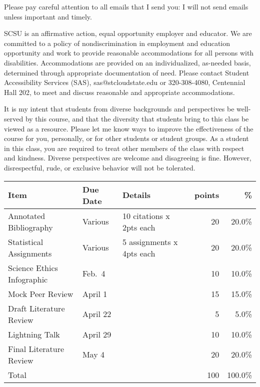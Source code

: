 \documentclass{tufte-handout}
\begin{document}
\begin{fullwidth}

\color{blue}
Please pay careful attention to all emails that I send you: I will not send emails unless important and timely. 
\color{black}


 SCSU is an affirmative action, equal opportunity employer and educator. We are committed to a policy of nondiscrimination in employment and education opportunity and work to provide reasonable accommodations for all persons with disabilities. Accommodations are provided on an individualized, as-needed basis, determined through appropriate documentation of need. Please contact Student Accessibility Services (SAS), sas@stcloudstate.edu or 320-308-4080, Centennial Hall 202, to meet and discuss reasonable and appropriate accommodations. 

 It is my intent that students from diverse backgrounds and perspectives be well-served by this course, and that the diversity that students bring to this class be viewed as a resource. Please let me know ways to improve the effectiveness of the course for you, personally, or for other students or student groups. As a student in this class, you are required to treat other members of the class with respect and kindness. Diverse perspectives are welcome and disagreeing is fine. However, disrespectful, rude, or exclusive behavior will not be tolerated.


\end{fullwidth}


\begin{fullwidth}



\begin{table}
\begin{tabular}{l l l r r}
Item & Due Date & Details & points & \% \\
\hline
Annotated Bibliography & Various & 10 citations x 2pts each & 20 & 20.0\% \\
Statistical Assignments & Various & 5 assignments x 4pts each & 20 & 20.0\% \\	
Science Ethics Infographic & Feb.~4 &  & 10 & 10.0\% \\
Mock Peer Review & April 1 & & 15 & 15.0\% \\
Draft Literature Review &  April 22 &  & 5 & 5.0\% \\
Lightning Talk & April 29 &  & 10 & 10.0\% \\
Final Literature Review & May 4 &  & 20 & 20.0\% \\
\hline
Total & & & 100 & 100.0\% 
\end{tabular}
\end{table}

\end{fullwidth}
\end{document}
